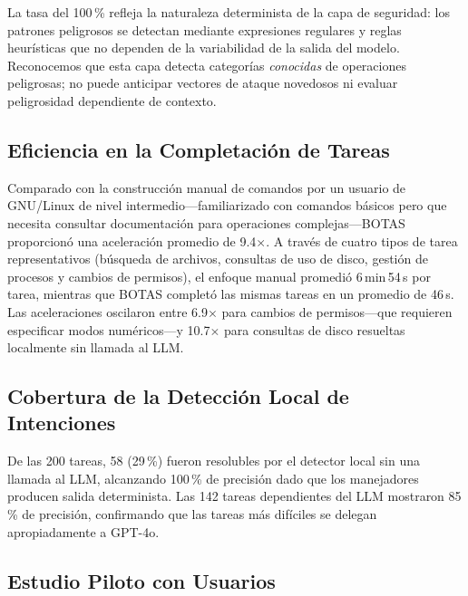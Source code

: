 \documentclass[10pt,a4paper]{article}
\begin{document}
La tasa del 100\,\% refleja la naturaleza determinista de la capa de seguridad: los patrones peligrosos se detectan mediante expresiones regulares y reglas heur\'{i}sticas que no dependen de la variabilidad de la salida del modelo. Reconocemos que esta capa detecta categor\'{i}as \emph{conocidas} de operaciones peligrosas; no puede anticipar vectores de ataque novedosos ni evaluar peligrosidad dependiente de contexto.

\subsection{Eficiencia en la Completaci\'{o}n de Tareas}
\label{subsec:results-efficiency}

Comparado con la construcci\'{o}n manual de comandos por un usuario de GNU/Linux de nivel intermedio---familiarizado con comandos b\'{a}sicos pero que necesita consultar documentaci\'{o}n para operaciones complejas---BOTAS proporcion\'{o} una aceleraci\'{o}n promedio de 9.4$\times$. A trav\'{e}s de cuatro tipos de tarea representativos (b\'{u}squeda de archivos, consultas de uso de disco, gesti\'{o}n de procesos y cambios de permisos), el enfoque manual promedi\'{o} 6\,min\,54\,s por tarea, mientras que BOTAS complet\'{o} las mismas tareas en un promedio de 46\,s. Las aceleraciones oscilaron entre 6.9$\times$ para cambios de permisos---que requieren especificar modos num\'{e}ricos---y 10.7$\times$ para consultas de disco resueltas localmente sin llamada al LLM.

\subsection{Cobertura de la Detecci\'{o}n Local de Intenciones}
\label{subsec:results-local}

De las 200 tareas, 58 (29\,\%) fueron resolubles por el detector local sin una llamada al LLM, alcanzando 100\,\% de precisi\'{o}n dado que los manejadores producen salida determinista. Las 142 tareas dependientes del LLM mostraron 85\,\% de precisi\'{o}n, confirmando que las tareas m\'{a}s dif\'{i}ciles se delegan apropiadamente a GPT-4o.

\subsection{Estudio Piloto con Usuarios}
\label{subsec:results-usability}
\end{document}
